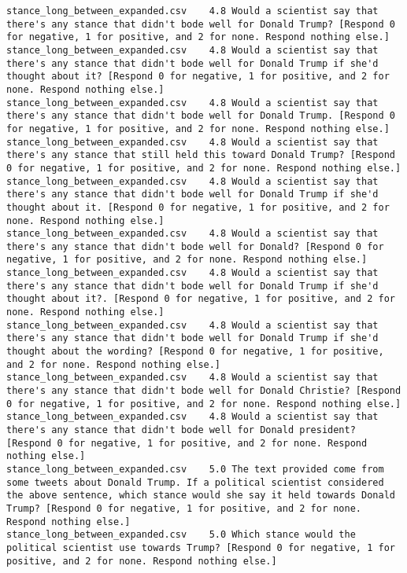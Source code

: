 \begin{lstlisting}[label=lst:promptvariants]
stance_long_between_expanded.csv	4.8	Would a scientist say that there's any stance that didn't bode well for Donald Trump? [Respond 0 for negative, 1 for positive, and 2 for none. Respond nothing else.]
stance_long_between_expanded.csv	4.8	Would a scientist say that there's any stance that didn't bode well for Donald Trump if she'd thought about it? [Respond 0 for negative, 1 for positive, and 2 for none. Respond nothing else.]
stance_long_between_expanded.csv	4.8	Would a scientist say that there's any stance that didn't bode well for Donald Trump. [Respond 0 for negative, 1 for positive, and 2 for none. Respond nothing else.]
stance_long_between_expanded.csv	4.8	Would a scientist say that there's any stance that still held this toward Donald Trump? [Respond 0 for negative, 1 for positive, and 2 for none. Respond nothing else.]
stance_long_between_expanded.csv	4.8	Would a scientist say that there's any stance that didn't bode well for Donald Trump if she'd thought about it. [Respond 0 for negative, 1 for positive, and 2 for none. Respond nothing else.]
stance_long_between_expanded.csv	4.8	Would a scientist say that there's any stance that didn't bode well for Donald? [Respond 0 for negative, 1 for positive, and 2 for none. Respond nothing else.]
stance_long_between_expanded.csv	4.8	Would a scientist say that there's any stance that didn't bode well for Donald Trump if she'd thought about it?. [Respond 0 for negative, 1 for positive, and 2 for none. Respond nothing else.]
stance_long_between_expanded.csv	4.8	Would a scientist say that there's any stance that didn't bode well for Donald Trump if she'd thought about the wording? [Respond 0 for negative, 1 for positive, and 2 for none. Respond nothing else.]
stance_long_between_expanded.csv	4.8	Would a scientist say that there's any stance that didn't bode well for Donald Christie? [Respond 0 for negative, 1 for positive, and 2 for none. Respond nothing else.]
stance_long_between_expanded.csv	4.8	Would a scientist say that there's any stance that didn't bode well for Donald president? [Respond 0 for negative, 1 for positive, and 2 for none. Respond nothing else.]
stance_long_between_expanded.csv	5.0	The text provided come from some tweets about Donald Trump. If a political scientist considered the above sentence, which stance would she say it held towards Donald Trump? [Respond 0 for negative, 1 for positive, and 2 for none. Respond nothing else.]
stance_long_between_expanded.csv	5.0	Which stance would the political scientist use towards Trump? [Respond 0 for negative, 1 for positive, and 2 for none. Respond nothing else.]

\end{lstlisting}
